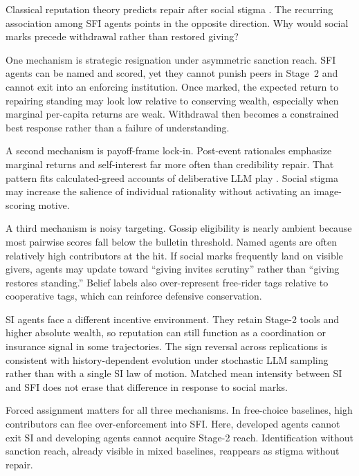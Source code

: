 Classical reputation theory predicts repair after social stigma .
The recurring association among SFI agents points in the opposite direction.
Why would social marks precede withdrawal rather than restored giving?

One mechanism is strategic resignation under asymmetric sanction reach.
SFI agents can be named and scored, yet they cannot punish peers in Stage~2 and cannot exit into an enforcing institution.
Once marked, the expected return to repairing standing may look low relative to conserving wealth, especially when marginal per-capita returns are weak.
Withdrawal then becomes a constrained best response rather than a failure of understanding.

A second mechanism is payoff-frame lock-in.
Post-event rationales emphasize marginal returns and self-interest far more often than credibility repair.
That pattern fits calculated-greed accounts of deliberative LLM play .
Social stigma may increase the salience of individual rationality without activating an image-scoring motive.

A third mechanism is noisy targeting.
Gossip eligibility is nearly ambient because most pairwise scores fall below the bulletin threshold.
Named agents are often relatively high contributors at the hit.
If social marks frequently land on visible givers, agents may update toward ``giving invites scrutiny'' rather than ``giving restores standing.''
Belief labels also over-represent free-rider tags relative to cooperative tags, which can reinforce defensive conservation.

SI agents face a different incentive environment.
They retain Stage-2 tools and higher absolute wealth, so reputation can still function as a coordination or insurance signal in some trajectories.
The sign reversal across replications is consistent with history-dependent evolution under stochastic LLM sampling rather than with a single SI law of motion.
Matched mean intensity between SI and SFI does not erase that difference in response to social marks.

Forced assignment matters for all three mechanisms.
In free-choice baselines, high contributors can flee over-enforcement into SFI.
Here, developed agents cannot exit SI and developing agents cannot acquire Stage-2 reach.
Identification without sanction reach, already visible in mixed baselines, reappears as stigma without repair.

